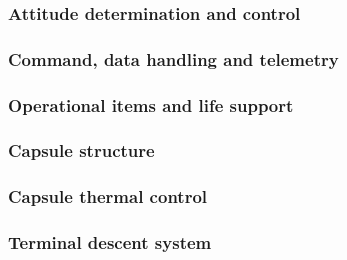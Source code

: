 

\subsubsection{Attitude determination and control} \label{subsec:adcs}


\subsubsection{Command, data handling and telemetry} \label{subsec:cdh}


\subsubsection{Operational items and life support} \label{subsec:crewop}


\subsubsection{Capsule structure} \label{subsec:crewstruc}


\subsubsection{Capsule thermal control} \label{subsec:crewthermalcontrol}


\subsubsection{Terminal descent system} \label{subsec:crewtermdescent}





